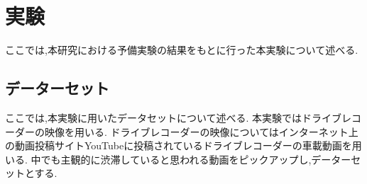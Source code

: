 \chapter{実験}
ここでは,本研究における予備実験の結果をもとに行った本実験について述べる.

\section{データーセット}
ここでは,本実験に用いたデータセットについて述べる.
本実験ではドライブレコーダーの映像を用いる.
ドライブレコーダーの映像についてはインターネット上の動画投稿サイトYouTubeに投稿されているドライブレコーダーの車載動画を用いる.
中でも主観的に渋滞していると思われる動画をピックアップし,データーセットとする.
